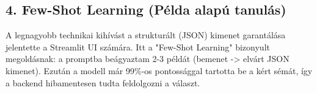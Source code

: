 \documentclass[a4paper,12pt]{article}
\begin{document}
\vspace{0.5em}

\subsection*{4. Few-Shot Learning (Példa alapú tanulás)}
A legnagyobb technikai kihívást a strukturált (JSON) kimenet garantálása jelentette a Streamlit UI számára. Itt a "Few-Shot Learning" bizonyult megoldásnak: a promptba beágyaztam 2-3 példát (bemenet -> elvárt JSON kimenet). Ezután a modell már 99\%-os pontossággal tartotta be a kért sémát, így a backend hibamentesen tudta feldolgozni a választ.
\end{document}

